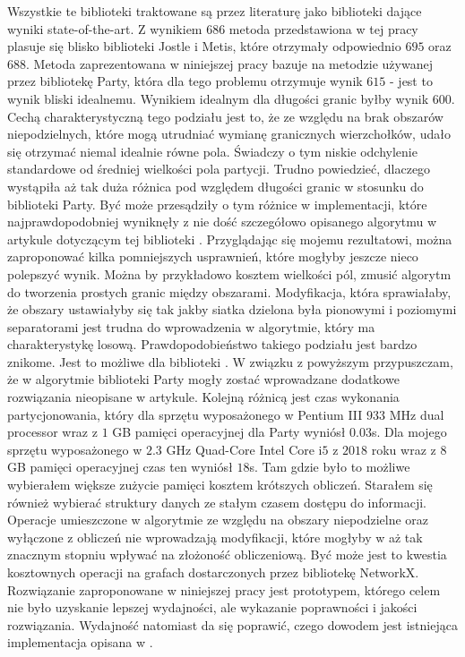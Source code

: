 Wszystkie te biblioteki traktowane są przez literaturę jako biblioteki dające wyniki state-of-the-art.
Z wynikiem $686$ metoda przedstawiona w tej pracy plasuje się blisko biblioteki Jostle i Metis,
które otrzymały odpowiednio $695$ oraz $688$.
Metoda zaprezentowana w niniejszej pracy bazuje na metodzie używanej przez bibliotekę Party, która dla tego problemu
otrzymuje wynik $615$ - jest to wynik bliski idealnemu.
Wynikiem idealnym dla długości granic byłby wynik $600$.
Cechą charakterystyczną tego podziału jest to, że ze względu na brak obszarów niepodzielnych, które mogą utrudniać
wymianę granicznych wierzchołków, udało się otrzymać niemal idealnie równe pola.
Świadczy o tym niskie odchylenie standardowe od średniej wielkości pola partycji.
Trudno powiedzieć, dlaczego wystąpiła aż tak duża różnica pod względem długości granic w stosunku do biblioteki Party.
Być może przesądziły o tym różnice w implementacji, które najprawdopodobniej wyniknęły z nie dość szczegółowo opisanego algorytmu
w artykule dotyczącym tej biblioteki \cite{1364754}.
Przyglądając się mojemu rezultatowi, można zaproponować kilka pomniejszych usprawnień, które mogłyby jeszcze nieco polepszyć wynik.
Można by przykładowo kosztem wielkości pól, zmusić algorytm do tworzenia prostych granic między obszarami.
Modyfikacja, która sprawiałaby, że obszary ustawiałyby się tak jakby siatka dzielona
była pionowymi i poziomymi separatorami jest trudna do wprowadzenia w algorytmie, który ma charakterystykę losową.
Prawdopodobieństwo takiego podziału jest bardzo znikome.
Jest to możliwe dla biblioteki \cite{1364754}.
W związku z powyższym przypuszczam, że w algorytmie biblioteki Party \cite{1364754} mogły zostać wprowadzane dodatkowe rozwiązania
nieopisane w artykule.
Kolejną różnicą jest czas wykonania partycjonowania, który dla sprzętu wyposażonego w Pentium III $933$ MHz dual processor
wraz z $1$ GB pamięci operacyjnej dla Party wyniósł $0.03$s.
Dla mojego sprzętu wyposażonego w $2.3$ GHz Quad-Core Intel Core i$5$ z $2018$ roku wraz z $8$ GB pamięci operacyjnej
czas ten wyniósł $18$s.
Tam gdzie było to możliwe wybierałem większe zużycie pamięci kosztem krótszych obliczeń.
Starałem się również wybierać struktury danych ze stałym czasem dostępu do informacji.
Operacje umieszczone w algorytmie ze względu na obszary niepodzielne oraz wyłączone z obliczeń nie wprowadzają
modyfikacji, które mogłyby w aż tak znacznym stopniu wpływać na złożoność obliczeniową.
Być może jest to kwestia kosztownych operacji na grafach dostarczonych przez bibliotekę NetworkX.
Rozwiązanie zaproponowane w niniejszej pracy jest prototypem, którego celem
nie było uzyskanie lepszej wydajności, ale wykazanie poprawności i jakości rozwiązania.
Wydajność natomiast da się poprawić, czego dowodem jest istniejąca implementacja opisana w \cite{1364754}.

